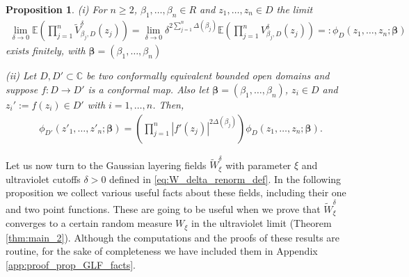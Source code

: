 \documentclass[a4paper, 11pt, reqno]{amsart}
\theoremstyle{definition} \newtheorem{defn}{Definition}[section]
\theoremstyle{remark} \newtheorem{rem}[defn]{Remark}
\theoremstyle{remark} \newtheorem*{rem*}{Remark}
\theoremstyle{plain} \newtheorem{thm}[defn]{Theorem}
\theoremstyle{plain} \newtheorem{lem}[defn]{Lemma}
\theoremstyle{plain} \newtheorem{prop}[defn]{Proposition}
\theoremstyle{plain} \newtheorem{cor}[defn]{Corollary}
\theoremstyle{remark} \newtheorem{exm}[defn]{\textbf{Example}}
\theoremstyle{remark} \newtheorem{exms}[defn]{\textbf{Examples}}
\theoremstyle{remark} \newtheorem*{bl}{}
\numberwithin{equation}{section} %
\newcommand{\C}{\mathbb{C}}
\newcommand{\E}{\mathbb{E}}
\begin{document}
	\begin{prop}\label{prop:n_point}
	(i)	For $n \ge 2$, $\beta_1, \ldots, \beta_n \in R$ and $z_1, \ldots, z_n \in D$ the limit
			\begin{align}\label{eq:conv_n_pt_0}
				\lim_{\delta \to 0} \E\left(\prod_{j=1}^{n} \tilde{V}^{\delta}_{\beta_j, D}(z_j)\right)=\lim_{\delta \to 0} \delta^{2\sum_{j=1}^n \Delta(\beta_j)} \E\left(\prod_{j=1}^n V^{\delta}_{\beta_j , D}(z_j)\right) = : \phi_D(z_1, \ldots, z_n; \bm{\beta})
			\end{align}
			exists finitely, with $\bm{\beta} = (\beta_1, \ldots, \beta_n)$ 
   
     (ii)  Let $D, D' \subset \C$ be two conformally equivalent bounded open domains and suppose $f: D \to D'$ is a conformal map. Also let $\bm{\beta} = (\beta_1, \ldots, \beta_n)$, $z_i \in D$ and $z_i':= f(z_i) \in D'$ with $i =1, \ldots, n$. Then, 
		\begin{align} \label{eq:conf_cov_n_pt}
			\phi_{D'}(z'_1, \ldots, z'_n;\bm{\beta}) = \left(\prod_{j=1}^n |f'(z_j)|^{2\Delta(\beta_j)}\right) \phi_D(z_1, \ldots, z_n;\bm{\beta}) .
		\end{align}		
	\end{prop}	
	
    Let us now turn to the Gaussian layering fields $\tilde{W}^{\delta}_{\xi}$ with parameter $\xi$ and ultraviolet cutoffs $\delta>0$ defined in \eqref{eq:W_delta_renorm_def}. In the following proposition we collect various useful facts about these fields, including their one and two point functions. These are going to be useful when we prove that $\tilde{W}^{\delta}_{\xi}$ converges to a certain random measure $W_{\xi}$ in the ultraviolet limit (Theorem \ref{thm:main_2}). Although the computations and the proofs of these results are routine, for the sake of completeness we have included them in Appendix \ref{app:proof_prop_GLF_facts}.     
    
\end{document}
